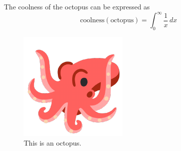 The coolness of the octopus can be expressed as
\begin{equation}
  \text{coolness}(\text{octopus}) = \int_0^\infty \frac{1}{x} \, dx  \label{octoCoolness} %
\end{equation}

\begin{figure}
  \begin{centering}
  \includegraphics[width=0.8\columnwidth]{octopus.pdf}
  \par\end{centering}
  \caption{This is an octopus.}
\end{figure}
